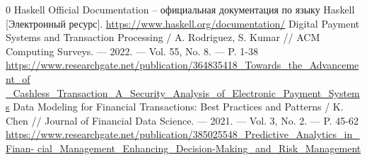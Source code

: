 \documentclass[a4paper,12pt]{article}
\begin{document}
		\newpage
	
	\vspace{-1.5cm}
	\begin{thebibliography}{0}
		Haskell Official Documentation -- официальная документация по языку Haskell [Электронный ресурс]. 	 
		\href {https://www.haskell.org/documentation/}{https://www.haskell.org/documentation/}
		Digital Payment Systems and Transaction Processing / A. Rodriguez, S. Kumar // ACM Computing Surveys. — 2022. — Vol. 55, No. 8. — P. 1-38
		\href {https://www.researchgate.net/publication/364835418_Towards_the_Advancement_of_Cashless_Transaction_A_Security_Analysis_of_Electronic_Payment_Systems}{https://www.researchgate.net/publication/364835418\_Towards\_the\_Advancement\_of
			\_Cashless\_Transaction\_A\_Security\_Analysis\_of\_Electronic\_Payment\_Systems}
		Data Modeling for Financial Transactions: Best Practices and Patterns / K. Chen // Journal of Financial Data Science. — 2021. — Vol. 3, No. 2. — P. 45-62	 
		\href {https://www.researchgate.net/publication/385025548_Predictive_Analytics_in_Financial_Management_Enhancing_Decision-Making_and_Risk_Management}{https://www.researchgate.net/publication/385025548\_Predictive\_Analytics\_in\_Finan-
			cial\_Management\_Enhancing\_Decision-Making\_and\_Risk\_Management}
		
	\end{thebibliography}
	
\end{document}
